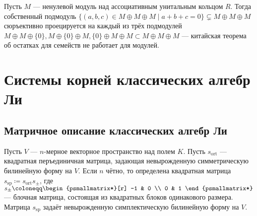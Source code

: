 \documentclass[
	extrafontsizes,
	11pt,
	hyphens,
]{memoir}
\begin{document}
\begin{example}
Пусть \(M\) --- ненулевой модуль над ассоциативным унитальным кольцом \(R\).
Тогда собственный подмодуль \(\{(a,b,c) \in M \oplus M \oplus M \mid a + b + c = 0\} \varsubsetneq M \oplus M \oplus M\) сюръективно проецируется на каждый из трёх подмодулей \(M \oplus M \oplus \{0\}, M \oplus \{0\} \oplus M, \{0\} \oplus M \oplus M \subset M \oplus M \oplus M\)
--- китайская теорема об остатках для семейств не работает для модулей.
\end{example}


\section{Системы корней классических алгебр Ли}

%

\subsection{Матричное описание классических алгебр Ли}

Пусть \(V\) --- \(n\)-мерное векторное пространство над полем \(K\).
Пусть \(s_{\mathrm{ort}}\) --- квадратная перъединичная матрица, задающая невырожденную симметрическую билинейную форму на \(V\).
Если \(n\) чётно, то определена квадратная матрица \(s_{\mathrm{sp}} \coloneqq s_{\mathrm{ort}} s_{\pm}\), где
\(
s_{\pm}
\coloneqq
\begin{psmallmatrix*}[r]
    -1 & 0 \\
    0 & 1
\end{psmallmatrix*}
\)
--- блочная матрица, состоящая из квадратных блоков одинакового размера. Матрица \(s_{\mathrm{sp}}\) задаёт невырожденную симплектическую билинейную форму на \(V\).
\end{document}
